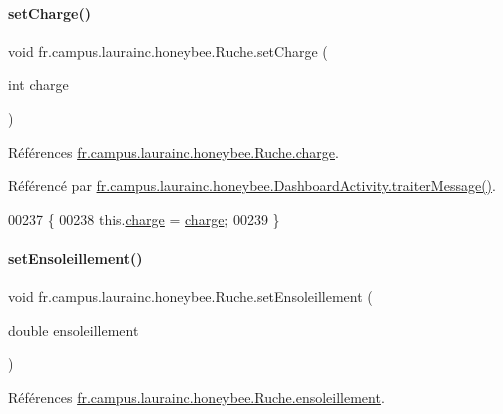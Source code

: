 \paragraph{\texorpdfstring{set\+Charge()}{setCharge()}}
{\footnotesize\ttfamily void fr.\+campus.\+laurainc.\+honeybee.\+Ruche.\+set\+Charge (\begin{DoxyParamCaption}\item[{int}]{charge }\end{DoxyParamCaption})}



Références \hyperlink{classfr_1_1campus_1_1laurainc_1_1honeybee_1_1_ruche_adf68ff1828b2eaa02c8411a9c5727bf9}{fr.\+campus.\+laurainc.\+honeybee.\+Ruche.\+charge}.



Référencé par \hyperlink{classfr_1_1campus_1_1laurainc_1_1honeybee_1_1_dashboard_activity_a50d4c14e993ff1779ae5dce8cee11216}{fr.\+campus.\+laurainc.\+honeybee.\+Dashboard\+Activity.\+traiter\+Message()}.


\begin{DoxyCode}
00237                                       \{
00238         this.\hyperlink{classfr_1_1campus_1_1laurainc_1_1honeybee_1_1_ruche_adf68ff1828b2eaa02c8411a9c5727bf9}{charge} = \hyperlink{classfr_1_1campus_1_1laurainc_1_1honeybee_1_1_ruche_adf68ff1828b2eaa02c8411a9c5727bf9}{charge};
00239     \}
\end{DoxyCode}
\mbox{\label{classfr_1_1campus_1_1laurainc_1_1honeybee_1_1_ruche_a19b9dae9928c6d8267c7c7c7ca3375aa}} 
\paragraph{\texorpdfstring{set\+Ensoleillement()}{setEnsoleillement()}}
{\footnotesize\ttfamily void fr.\+campus.\+laurainc.\+honeybee.\+Ruche.\+set\+Ensoleillement (\begin{DoxyParamCaption}\item[{double}]{ensoleillement }\end{DoxyParamCaption})}



Références \hyperlink{classfr_1_1campus_1_1laurainc_1_1honeybee_1_1_ruche_aebfc51ed0e12be0dddc7675884a8129b}{fr.\+campus.\+laurainc.\+honeybee.\+Ruche.\+ensoleillement}.



